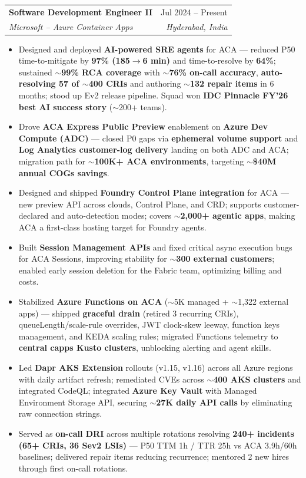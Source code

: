 \documentclass[a4paper,9pt]{extarticle}
\makeatletter
\newcommand{\resumeSubheading}[4]{
  \vspace{-2pt}\item
    \begin{tabular*}{0.97\textwidth}[t]{l@{\extracolsep{\fill}}r}
      \textbf{#1} & #2 \\
      \textit{\small #3} & \textit{\small #4} \\
    \end{tabular*}\vspace{-6pt}
}
\newcommand{\resumeItemPlain}[1]{
  \item\small{#1 \vspace{-3pt}}
}
\newcommand{\resumeItemListStart}{\begin{itemize}}
\newcommand{\resumeItemListEnd}{\end{itemize}\vspace{-6pt}}
\makeatother
\begin{document}
    \resumeSubheading
      {Software Development Engineer II}{Jul 2024 -- Present}
      {Microsoft -- Azure Container Apps}{Hyderabad, India}
      \resumeItemListStart
        \resumeItemPlain{Designed and deployed \textbf{AI-powered SRE agents} for ACA --- reduced P50 time-to-mitigate by \textbf{97\% (185$\rightarrow$6 min)} and time-to-resolve by \textbf{64\%}; sustained \textbf{$\sim$99\% RCA coverage} with \textbf{$\sim$76\% on-call accuracy}, \textbf{auto-resolving 57 of $\sim$400 CRIs} and authoring \textbf{$\sim$132 repair items} in 6 months; stood up Ev2 release pipeline. Squad won \textbf{IDC Pinnacle FY'26 best AI success story} ($\sim$200+ teams).}
        \resumeItemPlain{Drove \textbf{ACA Express Public Preview} enablement on \textbf{Azure Dev Compute (ADC)} --- closed P0 gaps via \textbf{ephemeral volume support} and \textbf{Log Analytics customer-log delivery} landing on both ADC and ACA; migration path for \textbf{$\sim$100K+ ACA environments}, targeting \textbf{$\sim$\$40M annual COGs savings}.}
        \resumeItemPlain{Designed and shipped \textbf{Foundry Control Plane integration} for ACA --- new preview API across clouds, Control Plane, and CRD; supports customer-declared and auto-detection modes; covers \textbf{$\sim$2,000+ agentic apps}, making ACA a first-class hosting target for Foundry agents.}
        \resumeItemPlain{Built \textbf{Session Management APIs} and fixed critical async execution bugs for ACA Sessions, improving stability for \textbf{$\sim$300 external customers}; enabled early session deletion for the Fabric team, optimizing billing and costs.}
        \resumeItemPlain{Stabilized \textbf{Azure Functions on ACA} ($\sim$5K managed + $\sim$1,322 external apps) --- shipped \textbf{graceful drain} (retired 3 recurring CRIs), queueLength/scale-rule overrides, JWT clock-skew leeway, function keys management, and KEDA scaling rules; migrated Functions telemetry to \textbf{central capps Kusto clusters}, unblocking alerting and agent skills.}
        \resumeItemPlain{Led \textbf{Dapr AKS Extension} rollouts (v1.15, v1.16) across all Azure regions with daily artifact refresh; remediated CVEs across \textbf{$\sim$400 AKS clusters} and integrated CodeQL; integrated \textbf{Azure Key Vault} with Managed Environment Storage API, securing \textbf{$\sim$27K daily API calls} by eliminating raw connection strings.}
        \resumeItemPlain{Served as \textbf{on-call DRI} across multiple rotations resolving \textbf{240+ incidents (65+ CRIs, 36 Sev2 LSIs)} --- P50 TTM 1h / TTR 25h vs ACA 3.9h/60h baselines; delivered repair items reducing recurrence; mentored 2 new hires through first on-call rotations.}
      \resumeItemListEnd
\end{document}
